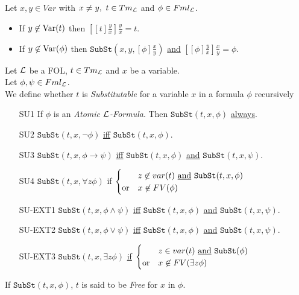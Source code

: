 \documentclass[11pt,a4paper]{article}
\begin{document}





Let $x,y\in Var$ with $x\neq y,\ t\in Tm_{\mathcal{L}}$ and $\phi\in Fml_{\mathcal{L}}$.
\begin{itemize}
	\item If $y\not\in\mathrm{Var}(t)$ then $\left[[t]\frac{y}x\right]\frac{y}x=t$.
	\item If $y\not\in\mathrm{Var}(\phi)$ then $\mathtt{SubSt}\left(x,y,[\phi]\frac{x}y\right)$ \underline{and} $\left[[\phi]\frac{y}x\right]\frac{x}y=\phi$.
\end{itemize}

Let $\mathcal{L}$ be a FOL, $t\in Tm_{\mathcal{L}}$ and $x$ be a variable.\\
Let $\phi,\psi\in Fml_{\mathcal{L}}$.\\
We define whether $t$ is \textit{Substitutable} for a variable $x$ in a formula $\phi$ recursively
\begin{itemize}
	\item[SU1] If $\phi$ is an \textit{Atomic $\mathcal{L}$-Formula}. Then $\mathtt{SubSt}(t,x,\phi)$ \underline{always}.
	\item[SU2] $\mathtt{SubSt}(t,x,\neg\phi)$ \underline{iff} $\mathtt{SubSt}(t,x,\phi)$.
	\item[SU3] $\mathtt{SubSt}(t,x,\phi\to\psi)$ \underline{iff} $\mathtt{SubSt}(t,x,\phi)$ \underline{and} $\mathtt{SubSt}(t,x,\psi)$.
	\item[SU4] $\mathtt{SubSt}(t,x,\forall z\phi)$ if $\begin{cases}&z\not\in var(t)\text{ \underline{and} }\mathtt{SubSt}(t,x,\phi)\\\text{or}&x\not\in FV(\phi)\end{cases}$
	\item[SU-EXT1] $\mathtt{SubSt}(t,x,\phi\wedge\psi)$ \underline{iff} $\mathtt{SubSt}(t,x,\phi)$ \underline{and} $\mathtt{SubSt}(t,x,\psi)$.
	\item[SU-EXT2] $\mathtt{SubSt}(t,x,\phi\vee\psi)$ \underline{iff} $\mathtt{SubSt}(t,x,\phi)$ \underline{and} $\mathtt{SubSt}(t,x,\psi)$.
	\item[SU-EXT3] $\mathtt{SubSt}(t,x,\exists z\phi)$ \underline{if} $\begin{cases}&z\in var(t)\text{ \underline{and} }\mathtt{SubSt}(\phi)\\\text{or}&x\not\in FV(\exists z\phi)\end{cases}$
\end{itemize}
\nb If $\mathtt{SubSt}(t,x,\phi)$, $t$ is said to be \textit{Free} for $x$ in $\phi$.\\
\end{document}
